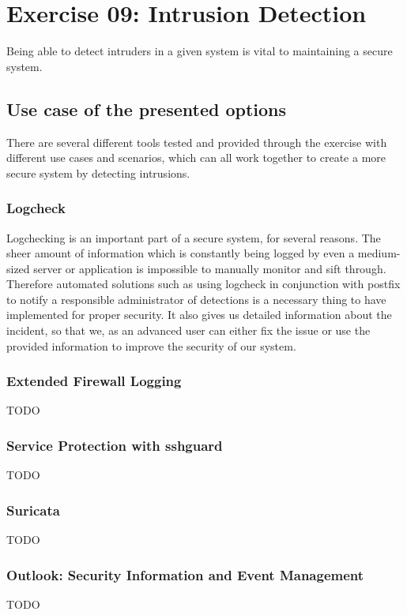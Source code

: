 \section{Exercise 09: Intrusion Detection}
Being able to detect intruders in a given system is vital to maintaining a secure system.
\subsection{Use case of the presented options}
There are several different tools tested and provided through the exercise with different use cases and scenarios, which can all work together to create a more secure system by detecting intrusions.
\subsubsection{Logcheck}
Logchecking is an important part of a secure system, for several reasons. The sheer amount of information which is constantly being logged by even a medium-sized server or application is impossible to manually monitor and sift through. Therefore automated solutions such as using logcheck in conjunction with postfix to notify a responsible administrator of detections is a necessary thing to have implemented for proper security. It also gives us detailed information about the incident, so that we, as an advanced user can either fix the issue or use the provided information to improve the security of our system.

\subsubsection{Extended Firewall Logging}
TODO

\subsubsection{Service Protection with sshguard}
TODO

\subsubsection{Suricata}
TODO

\subsubsection{Outlook: Security Information and Event Management}
TODO